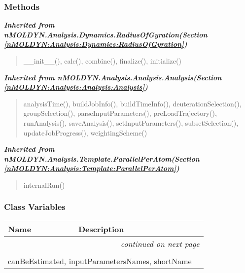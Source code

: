 
  \subsubsection{Methods}


\large{\textbf{\textit{Inherited from nMOLDYN.Analysis.Dynamics.RadiusOfGyration\textit{(Section \ref{nMOLDYN:Analysis:Dynamics:RadiusOfGyration})}}}}

\begin{quote}
\_\_init\_\_(), calc(), combine(), finalize(), initialize()
\end{quote}

\large{\textbf{\textit{Inherited from nMOLDYN.Analysis.Analysis.Analysis\textit{(Section \ref{nMOLDYN:Analysis:Analysis:Analysis})}}}}

\begin{quote}
analysisTime(), buildJobInfo(), buildTimeInfo(), deuterationSelection(), groupSelection(), parseInputParameters(), preLoadTrajectory(), runAnalysis(), saveAnalysis(), setInputParameters(), subsetSelection(), updateJobProgress(), weightingScheme()
\end{quote}

\large{\textbf{\textit{Inherited from nMOLDYN.Analysis.Template.ParallelPerAtom\textit{(Section \ref{nMOLDYN:Analysis:Template:ParallelPerAtom})}}}}

\begin{quote}
internalRun()
\end{quote}


  \subsubsection{Class Variables}

    \vspace{-1cm}
\hspace{\varindent}\begin{longtable}{|p{\varnamewidth}|p{\vardescrwidth}|l}
\cline{1-2}
\cline{1-2} \centering \textbf{Name} & \centering \textbf{Description}& \\
\cline{1-2}
\endhead\cline{1-2}\multicolumn{3}{r}{\small\textit{continued on next page}}\\\endfoot\cline{1-2}
\endlastfoot\multicolumn{2}{|l|}{\textit{Inherited from nMOLDYN.Analysis.Dynamics.RadiusOfGyration \textit{(Section \ref{nMOLDYN:Analysis:Dynamics:RadiusOfGyration})}}}\\
\multicolumn{2}{|p{\varwidth}|}{\raggedright canBeEstimated, inputParametersNames, shortName}\\
\cline{1-2}
\end{longtable}

